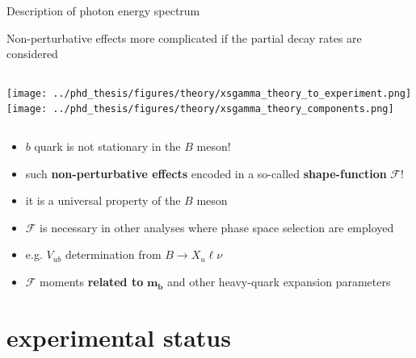 \documentclass[xcolor=dvipsnames]{beamer}
\begin{document}
\begin{frame}{Description of \BtoXsgamma photon energy spectrum}

   \scriptsize\centering

   Non-perturbative effects more complicated if the partial decay rates are considered

   \vspace{10pt}

   \begin{columns}
      \centering
      \texttt{[image: ../phd\_thesis/figures/theory/xsgamma\_theory\_to\_experiment.png]}
      \centering
      \texttt{[image: ../phd\_thesis/figures/theory/xsgamma\_theory\_components.png]}
   \end{columns}

   \begin{itemize}
      \item $b$ quark is not stationary in the $B$ meson!
      \item such \textbf{non-perturbative effects} encoded in a so-called \textbf{shape-function} $\bm{\mathcal{F}}$!
      \item[\ra] it is a universal property of the $B$ meson
      \item[\ra] $\mathcal{F}$ is necessary in other analyses where phase space selection are employed
      \item[\ra] e.g. $V_{ub}$ determination from $B\to X_u\ell\nu$ 
      \item $\mathcal{F}$ moments \textbf{related to} $\bm{m_b}$ and other heavy-quark expansion parameters
   \end{itemize}
   
\end{frame}

   \section{\safeBtoXsdgamma experimental status}
\end{document}
